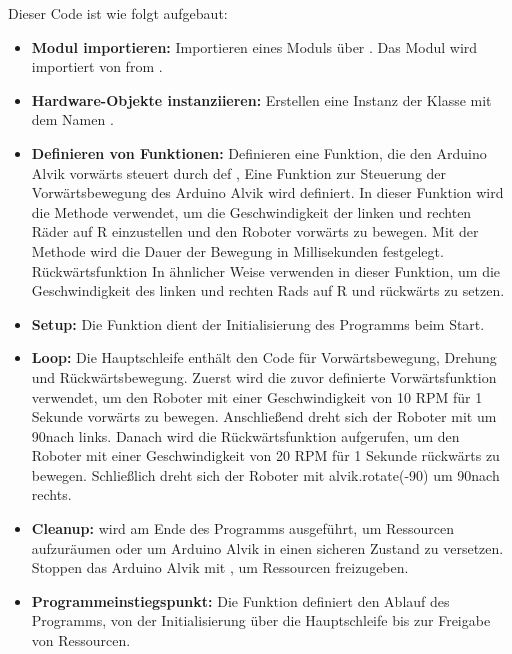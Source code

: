 \begin{enumerate}
{		{	\pythonstyle
			}
	}
	Dieser Code ist wie folgt aufgebaut:
	\begin{itemize}
		\item \textbf{Modul importieren:} Importieren eines  Moduls über . Das Modul  wird importiert von from . %
		\item \textbf{Hardware-Objekte instanziieren:} Erstellen eine Instanz der Klasse  mit dem Namen .
		\item \textbf{Definieren von Funktionen:} Definieren eine Funktion, die den Arduino Alvik vorwärts steuert durch def , Eine Funktion zur Steuerung der Vorwärtsbewegung des Arduino Alvik wird definiert. In dieser Funktion wird die Methode  verwendet, um die Geschwindigkeit der linken und rechten Räder auf R einzustellen und den Roboter vorwärts zu bewegen. Mit der Methode  wird die Dauer der Bewegung in Millisekunden festgelegt. Rückwärtsfunktion  In ähnlicher Weise verwenden  in dieser Funktion, um die Geschwindigkeit des linken und rechten Rads auf R und rückwärts zu setzen.
		\item \textbf{Setup:} Die Funktion  dient der Initialisierung des Programms beim Start.
		\item \textbf{Loop:} Die Hauptschleife enthält den Code für Vorwärtsbewegung, Drehung und Rückwärtsbewegung. Zuerst wird die zuvor definierte Vorwärtsfunktion  verwendet, um den Roboter mit einer Geschwindigkeit von 10 RPM für 1 Sekunde vorwärts zu bewegen. Anschlie\ss end dreht sich der Roboter mit  um 90\textdegree nach links. Danach wird die Rückwärtsfunktion  aufgerufen, um den Roboter mit einer Geschwindigkeit von 20 RPM für 1 Sekunde rückwärts zu bewegen. Schlie\ss lich dreht sich der Roboter mit alvik.rotate(-90) um 90\textdegree nach rechts.
		\item \textbf{Cleanup:}  wird am Ende des Programms ausgeführt, um Ressourcen aufzuräumen oder um Arduino Alvik in einen sicheren Zustand zu versetzen. Stoppen das Arduino Alvik mit , um Ressourcen freizugeben.
		\item \textbf{Programmeinstiegspunkt:}  Die Funktion  definiert den Ablauf des Programms, von der Initialisierung über die Hauptschleife bis zur Freigabe von Ressourcen.
	\end{itemize}
	
\end{enumerate}



